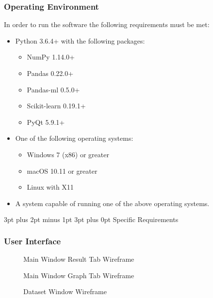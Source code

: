 \documentclass[12pt,a4paper]{article}
\makeatletter
\renewcommand\subsection{\@startsection {subsection}{1}{2mm} %
                               {3pt plus 2pt minus 1pt} %
                               {3pt plus 0pt} %
                               {\normalfont\bfseries}}
\makeatother
\begin{document}
\subsubsection{Operating Environment}
In order to run the software the following requirements must be met:
\begin{itemize}
	\item{Python 3.6.4+ with the following packages:}
	\begin{itemize}
		\item{NumPy 1.14.0+}
		\item{Pandas 0.22.0+}
		\item{Pandas-ml 0.5.0+}
		\item{Scikit-learn 0.19.1+}
		\item{PyQt 5.9.1+}
	\end{itemize}
\item{One of the following operating systems:}
	\begin{itemize}
		\item{Windows 7 (x86) or greater}
		\item{macOS 10.11 or greater}
		\item{Linux with X11}
	\end{itemize}
	\item{A system capable of running one of the above operating systems.}
\end{itemize}

\subsection{Specific Requirements}
\subsubsection{User Interface}
\begin{figure}[H]
\caption{Main Window Result Tab Wireframe}
\label{mainwf}
\end{figure}
\begin{figure}[H]
\caption{Main Window Graph Tab Wireframe}
\label{graphwf}
\end{figure}
\begin{figure}[H]
\caption{Dataset Window Wireframe}
\label{datasetwf}
\end{figure}
\end{document}
